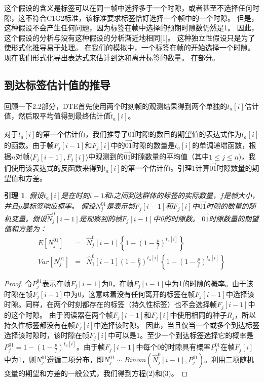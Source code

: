 \documentclass[UTF8]{ctexart}
\newcommand{\RNum}[1]{\uppercase\expandafter{\romannumeral #1\relax}}
\newtheorem{lemma}{引理}
\newtheorem*{proof}{证明}
\begin{document}
这个假设的含义是标签可以在同一帧中选择多于一个时隙，或者甚至不选择任何时隙，这不符合C1G2标准，该标准要求标签恰好选择一个帧中的一个时隙。 但是，这种假设不会产生任何问题，因为标签在帧中选择的预期时隙数仍然是1。 因此，这个假设的分析与没有这种假设的分析渐近地相同[1]。 这种独立性假设只是为了使形式化推导易于处理。 在我们的模拟中，一个标签在帧的开始选择一个时隙。 现在我们形式化导出表达式来估计到达和离开标签的数量。 在\RNum{4}部分。

\subsection{到达标签估计值的推导}
回顾一下2.2部分，DTE首先使用两个时刻帧的观测结果得到两个单独的$t_a[i]$估计值，然后取平均值得到最终估计值$\widetilde{t}_a[i]$。

对于$t_a[i]$的第一个估计值，我们推导了$\overrightarrow{01}$时隙的数目的期望值的表达式作为$t_a[i]$的函数。由于帧$F_j[i-1]$和$F_j[i]$中的$\overrightarrow{01}$时隙的数量是$t_a[i]$的单调递增函数，根据$n$对帧$\langle F_j[i-1],F_j[i]\rangle$中观测到的$\overrightarrow{01}$时隙数量的平均值（其中$1\leq j\leq n$)，我们使用该表达式的反函数来得到$t_a[i]$的第一个估计值。引理1计算$\overrightarrow{01}$时隙数量的期望值和方差。

\begin{lemma}
假设$t_a[i]$是在时刻$i-1$和$i$之间到达群体的标签的实际数量，$f$是帧大小，并且$p$是标签响应概率。 假设$N^{01}_j$是表示帧$F_j[i-1]$和$F_j[i]$中$\overrightarrow{01}$时隙的数量的随机变量。假设$\hat{N}^0_j[i-1]$是观察到的帧$F_j[i-1]$中0的时隙数。 $\overrightarrow{01}$时隙数量的期望值和方差为：
\begin{eqnarray}
E[N^{01}_j]&=&\hat{N}^0_j[i-1]\left\{1-\left(1-\frac{p}{f}\right)^{t_a[i]}\right\}\\
Var[N^{01}_j]&=&\hat{N}^0_1[i-1]\left(1-\frac{p}{f}\right)^{t_a[i]}\left\{1-\left(1-\frac{p}{f}\right)^{t_a[i]}\right\}
\end{eqnarray}
\end{lemma}

\begin{proof}
令$P^{01}_j$表示在帧$F_j[i-1]$为0，在帧$F_j[i-1]$中为1的时隙的概率。由于该时隙在帧$F_j[i-1]$中为0，这意味着没有任何离开的标签在帧$F_j[i-1]$中选择该时隙。同样，在两个时刻都存在的标签（持久性标签）也不会选择帧$F_j[i-1]$中的这个时隙。 由于阅读器在两个帧$F_j[i-1]$和$F_j[i]$中使用相同的种子$R_j$，所以持久性标签都没有在帧$F_j[i]$中选择该时隙。 因此，当且仅当一个或多个到达标签选择该时隙时，该时隙在帧$F_j[i]$中可以是1。至少一个到达标签选择它的概率是$P^01_j=1-\left(1-\frac{p}{f}\right)^{t_a[i]}$。由于帧$F_j[i-1]$中每个0的时隙具有概率$P^{01}_j$在帧$F_j[i]$中为1，则$N^{01}_j$遵循二项分布，即$N^{01}_j\sim Binom(\hat{N}^0_j[i-1],P^{01}_j)$。利用二项随机变量的期望和方差的一般公式，我们得到方程(2)和(3)。
\end{proof}
\end{document}
